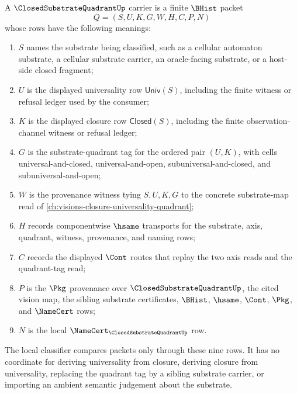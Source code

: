 \begin{definition}
\label{def:closed-substrate-quadrant-carrier}
A $\ClosedSubstrateQuadrantUp$ carrier is a finite $\BHist$ packet
$$
Q=(S,U,K,G,W,H,C,P,N)
$$
whose rows have the following meanings:
\begin{enumerate}
\item $S$ names the substrate being classified, such as a cellular automaton substrate, a cellular substrate carrier, an oracle-facing substrate, or a host-side closed fragment;
\item $U$ is the displayed universality row $\mathsf{Univ}(S)$, including the finite witness or refusal ledger used by the consumer;
\item $K$ is the displayed closure row $\mathsf{Closed}(S)$, including the finite observation-channel witness or refusal ledger;
\item $G$ is the substrate-quadrant tag for the ordered pair $(U,K)$, with cells universal-and-closed, universal-and-open, subuniversal-and-closed, and subuniversal-and-open;
\item $W$ is the provenance witness tying $S,U,K,G$ to the concrete substrate-map read of \autoref{ch:visions-closure-universality-quadrant};
\item $H$ records componentwise $\hsame$ transports for the substrate, axis, quadrant, witness, provenance, and naming rows;
\item $C$ records the displayed $\Cont$ routes that replay the two axis reads and the quadrant-tag read;
\item $P$ is the $\Pkg$ provenance over $\ClosedSubstrateQuadrantUp$, the cited vision map, the sibling substrate certificates, $\BHist$, $\hsame$, $\Cont$, $\Pkg$, and $\NameCert$ rows;
\item $N$ is the local $\NameCert_{\ClosedSubstrateQuadrantUp}$ row.
\end{enumerate}
The local classifier compares packets only through these nine rows. It has no coordinate for deriving universality from closure, deriving closure from universality, replacing the quadrant tag by a sibling substrate carrier, or importing an ambient semantic judgement about the substrate.
\end{definition}

